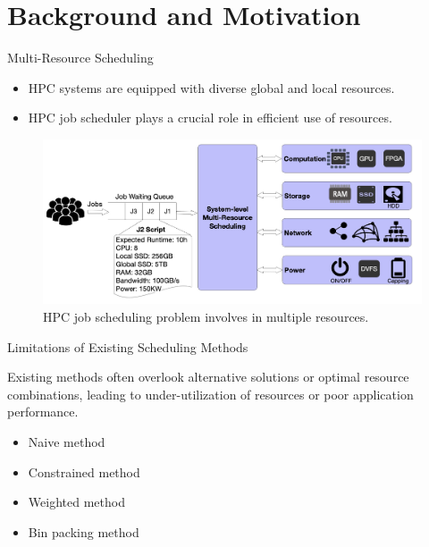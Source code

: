 \documentclass[aspectratio=1610]{beamer}
\begin{document}
\section{Background and Motivation}

\begin{frame}{Multi-Resource Scheduling}

    \begin{itemize}
        \item HPC systems are equipped with diverse global and local resources.
        \item HPC job scheduler plays a crucial role in efficient use of resources.
    \end{itemize}

    \begin{figure}[htpb]
        \begin{center}
            \includegraphics[keepaspectratio, scale=0.12]{pic/sched_with_multi_res.jpeg}
        \end{center}
        \caption{HPC job scheduling problem involves in multiple resources.}
        \label{fig:sched_with_multi_res}
    \end{figure}
   
\end{frame}

\begin{frame}{Limitations of Existing Scheduling Methods}
    
    Existing methods often overlook alternative solutions or optimal resource combinations, leading to under-utilization of resources or poor application performance.
    
    \begin{itemize}
        \item Naive method
        \item Constrained method
        \item Weighted method
        \item Bin packing method
    \end{itemize}
    
\end{frame}
\end{document}
